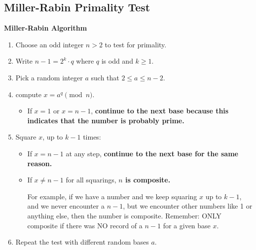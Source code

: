 \subsection{Miller-Rabin Primality Test}


\begin{center}
    \textbf{Miller-Rabin Algorithm }    
\end{center}

\begin{enumerate}
    \item Choose an odd integer \(n > 2\) to test for primality.
    \item Write \(n - 1 = 2^k \cdot q\) where \(q\) is odd and \(k \geq 1\). 
    \item Pick a random integer \(a\) such that \(2 \leq a \leq n - 2\).
    \item compute \(x = a^q \pmod{n}\).
    \begin{itemize}
        \item If \(x = 1\) or \(x = n - 1\), \textbf{continue to the next base because this indicates that the number is probably prime.}
    \end{itemize}
    \item Square \(x\), up to \(k - 1\) times:
    \begin{itemize}
        \item If \(x = n - 1\) at any step, \textbf{continue to the next base for the same reason.}
        \item If \(x \ne n - 1\) for all squarings, \textbf{\(n\) is composite.}
        
        For example, if we have a number and we keep squaring \(x\) up to \(k - 1\), and we never encounter a \(n - 1\), but we encounter other numbers like 1 or anything else, then the number is composite. Remember: ONLY composite if there was NO record of a \(n - 1\) for a given base \(x\).
    \end{itemize}
    \item Repeat the test with different random bases \(a\).
\end{enumerate}

